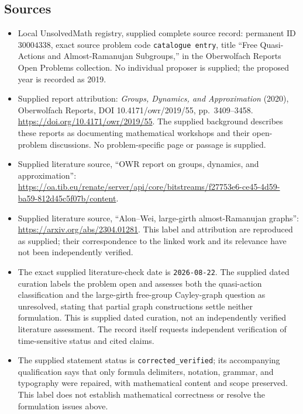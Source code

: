 \documentclass[11pt]{article}
\begin{document}
\subsection{Sources}
\begin{itemize}
\item Local UnsolvedMath registry, supplied complete source record: permanent ID \(30004338\), exact source problem code \texttt{catalogue entry}, title ``Free Quasi-Actions and Almost-Ramanujan Subgroups,'' in the Oberwolfach Reports Open Problems collection. No individual proposer is supplied; the proposed year is recorded as 2019.
\item Supplied report attribution: \emph{Groups, Dynamics, and Approximation} (2020), Oberwolfach Reports, DOI 10.4171/owr/2019/55, pp.\ 3409--3458. \url{https://doi.org/10.4171/owr/2019/55}. The supplied background describes these reports as documenting mathematical workshops and their open-problem discussions. No problem-specific page or passage is supplied.
\item Supplied literature source, ``OWR report on groups, dynamics, and approximation'': \url{https://oa.tib.eu/renate/server/api/core/bitstreams/f27753e6-ce45-4d59-ba59-812d45c5f07b/content}.
\item Supplied literature source, ``Alon--Wei, large-girth almost-Ramanujan graphs'': \url{https://arxiv.org/abs/2304.01281}. This label and attribution are reproduced as supplied; their correspondence to the linked work and its relevance have not been independently verified.
\item The exact supplied literature-check date is \texttt{2026-08-22}. The supplied dated curation labels the problem open and assesses both the quasi-action classification and the large-girth free-group Cayley-graph question as unresolved, stating that partial graph constructions settle neither formulation. This is supplied dated curation, not an independently verified literature assessment. The record itself requests independent verification of time-sensitive status and cited claims.
\item The supplied statement status is \texttt{corrected\_verified}; its accompanying qualification says that only formula delimiters, notation, grammar, and typography were repaired, with mathematical content and scope preserved. This label does not establish mathematical correctness or resolve the formulation issues above.
\end{itemize}
\end{document}
